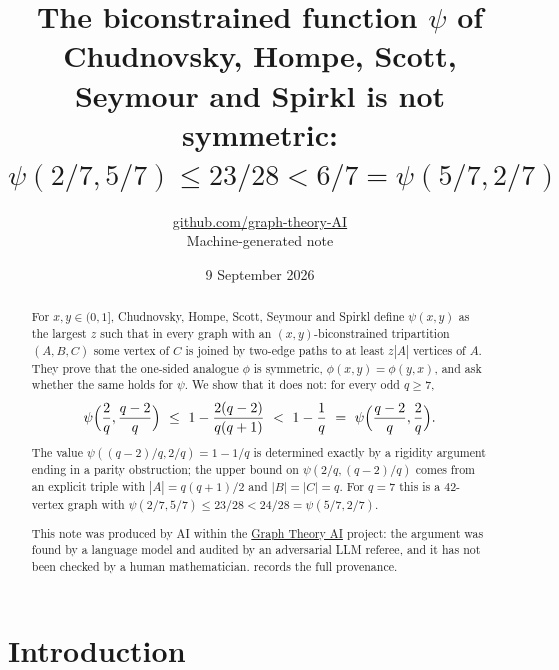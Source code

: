 \documentclass[11pt,a4paper]{article}
\title{The biconstrained function $\psi$ of Chudnovsky, Hompe, Scott, Seymour and Spirkl is not symmetric:\\ $\psi(2/7,5/7)\le 23/28<6/7=\psi(5/7,2/7)$}
\author{\href{https://github.com/graph-theory-AI}{github.com/graph-theory-AI}\\[2pt] \normalsize Machine-generated note}
\date{9 September 2026}
\theoremstyle{plain}
\theoremstyle{definition}
\theoremstyle{remark}
\begin{document}
\maketitle


\begin{abstract}
For $x,y\in(0,1]$, Chudnovsky, Hompe, Scott, Seymour and Spirkl define $\psi(x,y)$ as the largest $z$ such that in every graph with an $(x,y)$-biconstrained tripartition $(A,B,C)$ some vertex of $C$ is joined by two-edge paths to at least $z|A|$ vertices of $A$. They prove that the one-sided analogue $\phi$ is symmetric, $\phi(x,y)=\phi(y,x)$, and ask whether the same holds for $\psi$. We show that it does not: for every odd $q\ge7$,
\[
 \psi\Bigl(\frac2q,\frac{q-2}q\Bigr)\ \le\ 1-\frac{2(q-2)}{q(q+1)}\ <\ 1-\frac1q\ =\ \psi\Bigl(\frac{q-2}q,\frac2q\Bigr).
\]
The value $\psi((q-2)/q,2/q)=1-1/q$ is determined exactly by a rigidity argument ending in a parity obstruction; the upper bound on $\psi(2/q,(q-2)/q)$ comes from an explicit triple with $|A|=q(q+1)/2$ and $|B|=|C|=q$. For $q=7$ this is a $42$-vertex graph with $\psi(2/7,5/7)\le23/28<24/28=\psi(5/7,2/7)$.

\medskip\noindent\small
This note was produced by AI within the \href{https://github.com/graph-theory-AI/Graph-Theory-LLM-Proofs}{Graph Theory AI} project:
the argument was found by a language model and audited by an adversarial LLM
referee, and it has not been checked by a human mathematician.
 records the full provenance.

\end{abstract}

\section{Introduction}
\end{document}
